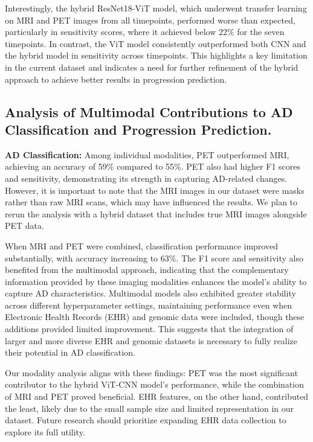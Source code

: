 Interestingly, the hybrid ResNet18-ViT model, which underwent transfer learning on MRI and PET images from all timepoints, performed worse than expected, particularly in sensitivity scores, where it achieved below 22\% for the seven timepoints. In contrast, the ViT model consistently outperformed both CNN and the hybrid model in sensitivity across timepoints. This highlights a key limitation in the current dataset and indicates a need for further refinement of the hybrid approach to achieve better results in progression prediction.

\subsection{Analysis of Multimodal Contributions to AD Classification and Progression Prediction.} 

\textbf{AD Classification:} Among individual modalities, PET outperformed MRI, achieving an accuracy of 59\% compared to 55\%. PET also had higher F1 scores and sensitivity, demonstrating its strength in capturing AD-related changes. However, it is important to note that the MRI images in our dataset were masks rather than raw MRI scans, which may have influenced the results. We plan to rerun the analysis with a hybrid dataset that includes true MRI images alongside PET data.

When MRI and PET were combined, classification performance improved substantially, with accuracy increasing to 63\%. The F1 score and sensitivity also benefited from the multimodal approach, indicating that the complementary information provided by these imaging modalities enhances the model’s ability to capture AD characteristics. Multimodal models also exhibited greater stability across different hyperparameter settings, maintaining performance even when Electronic Health Records (EHR) and genomic data were included, though these additions provided limited improvement. This suggests that the integration of larger and more diverse EHR and genomic datasets is necessary to fully realize their potential in AD classification.

Our modality analysis aligns with these findings: PET was the most significant contributor to the hybrid ViT-CNN model’s performance, while the combination of MRI and PET proved beneficial. EHR features, on the other hand, contributed the least, likely due to the small sample size and limited representation in our dataset. Future research should prioritize expanding EHR data collection to explore its full utility.

